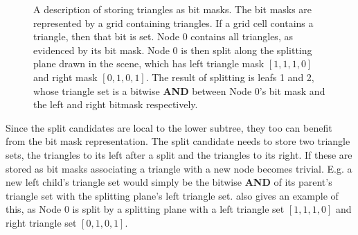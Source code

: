 \begin{figure}
  \centering
  \caption[A description of storing triangles as bit masks.]{A
    description of storing triangles as bit masks. The bit masks are
    represented by a grid containing triangles. If a grid cell
    contains a triangle, then that bit is set. Node 0 contains all
    triangles, as evidenced by its bit mask. Node 0 is then split
    along the splitting plane drawn in the scene, which has left
    triangle mask $[1,1,1,0]$ and right mask $[0,1,0,1]$. The result
    of splitting is leafs 1 and 2, whose triangle set is a bitwise
    \textbf{AND} between Node 0's bit mask and the left and right bitmask
    respectively.}
  \label{fig:bitmap}
\end{figure}


Since the split candidates are local to the lower subtree, they too
can benefit from the bit mask representation. The split candidate
needs to store two triangle sets, the triangles to its left after a
split and the triangles to its right. If these are stored as bit masks
associating a triangle with a new node becomes trivial. E.g. a new
left child's triangle set would simply be the bitwise \textbf{AND} of
its parent's triangle set with the splitting plane's left triangle
set.  also gives an example of this, as Node 0 is
split by a splitting plane with a left triangle set $[1,1,1,0]$ and
right triangle set $[0,1,0,1]$.

